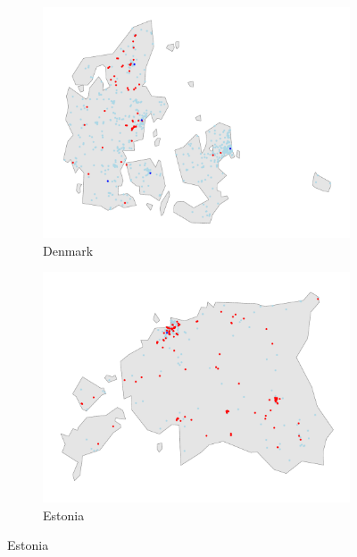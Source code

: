 \documentclass[12pt]{report}
\begin{document}
\begin{figure}[ht]
\begin{subfigure}[b]{0.45\textwidth}
        \includegraphics[width=\linewidth]{../Output/DK_map.pdf}
        \caption{Denmark}
        \label{fig:map_obs_DK}
    \end{subfigure}
    \hfill
    \begin{subfigure}[b]{0.45\textwidth}
        \centering
        \includegraphics[width=\linewidth]{../Output/EE_map.pdf}
        \caption{Estonia}
        \label{fig:map_obs_EE}
    \end{subfigure}
\end{figure}
\end{document}
